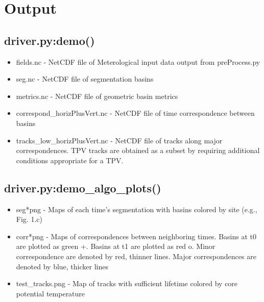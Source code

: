 \documentclass[a4paper]{article}
\begin{document}
\section{Output}
\subsection{driver.py:demo()}
\begin{itemize}
\item fields.nc - NetCDF file of Meterological input data output from preProcess.py
\item seg.nc - NetCDF file of segmentation basins
\item metrics.nc - NetCDF file of geometric basin metrics
\item correspond\_horizPlusVert.nc - NetCDF file of time correspondence between basins
\item tracks\_low\_horizPlusVert.nc - NetCDF file of tracks along major correspondences. TPV tracks are obtained as a subset by requiring additional conditions appropriate for a TPV.
\end{itemize}

\subsection{driver.py:demo\_algo\_plots()}
\begin{itemize}
\item seg*png - Maps of each time's segmentation with basins colored by site (e.g., Fig. 1.c)
\item corr*png - Maps of correspondences between neighboring times. Basins at t0 are plotted as green +. Basins at t1 are plotted as red o. Minor correspondence are denoted by red, thinner lines. Major correspondences are denoted by blue, thicker lines
\item test\_tracks.png - Map of tracks with sufficient lifetime colored by core potential temperature
\end{itemize}
\end{document}
